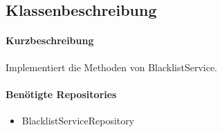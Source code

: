 \subsection*{Klassenbeschreibung}%
\paragraph*{Kurzbeschreibung}
Implementiert die Methoden von BlacklistService.
\paragraph*{Benötigte Repositories}
\begin{itemize}
    \item BlacklistServiceRepository
\end{itemize}